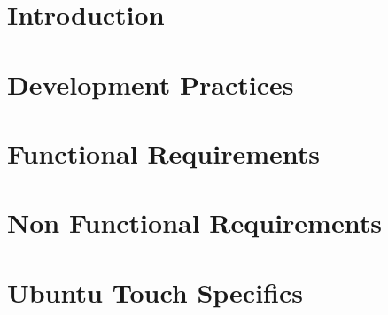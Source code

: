 



\chapter{Introduction}







\chapter{Development Practices}






\chapter{Functional Requirements}






\newpage


\chapter{Non Functional Requirements}





\chapter{Ubuntu Touch Specifics}









%



